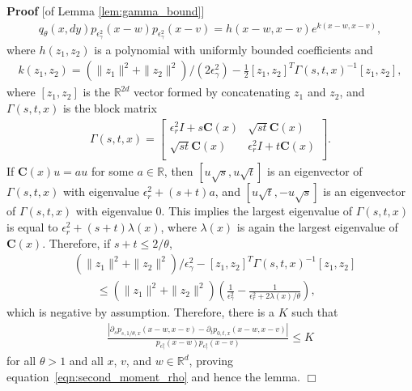 \documentclass[12pt]{article}
\newenvironment {proof}{{\noindent\bf Proof }}{\hfill $\Box$ \medskip}
\newcommand{\IR}{\mathbb R}
\newcommand{\covq}{\mathbf{C}}     %
\numberwithin{equation}{section}
\begin{document}
\begin{proof}[of Lemma \ref{lem:gamma_bound}]
\begin{align*}
{            q_\theta(x, dy)
        }{
            p_{\epsilon_\gamma^2}(x - w)
            p_{\epsilon_\gamma^2}(x - v)
        }
        =
        h(x-w, x-v) e^{ k(x-w, x-v) },
    \end{align*}
    where $h(z_1, z_2)$ is a polynomial with uniformly bounded coefficients and
    \begin{align*}
        k(z_1, z_2)
        =
        (\|z_1\|^2 + \|z_2\|^2)/(2 \epsilon_\gamma^2)
            - \frac{1}{2} [z_1, z_2]^T \Gamma(s, t, x)^{-1} [z_1, z_2] ,
    \end{align*}
    where $[z_1, z_2]$ is the $\IR^{2d}$ vector formed by concatenating $z_1$ and $z_2$,
    and $\Gamma(s, t, x)$ is the block matrix
    \begin{align*}
        \Gamma(s, t, x)
        =
        \left[
        \begin{array}{cc}
            \epsilon_r^2 I + s \covq(x) & \sqrt{st} \covq(x) \\
            \sqrt{st} \covq(x) & \epsilon_r^2 I + t \covq(x) \\
        \end{array}
        \right] .
    \end{align*}
    If $\covq(x) u = a u$ for some $a \in \IR$,
    then $[u \sqrt{s}, u \sqrt{t}]$ is an eigenvector of $\Gamma(s, t, x)$
    with eigenvalue $\epsilon^2_r + (s+t) a$,
    and $[u \sqrt{t}, - u \sqrt{s}]$ is an eigenvector of $\Gamma(s, t, x)$
    with eigenvalue 0.
    This implies the largest eigenvalue of $\Gamma(s, t, x)$
    is equal to $\epsilon^2_r + (s+t) \lambda(x)$,
    where $\lambda(x)$ is again the largest eigenvalue of $\covq(x)$.
    Therefore, if $s + t \le 2 / \theta$,
    \begin{align*}
        &
        (\|z_1\|^2 + \|z_2\|^2) / \epsilon^2_\gamma
            - [z_1, z_2]^T \Gamma(s, t, x)^{-1} [z_1, z_2]
        \\ &\qquad \le
        (\|z_1\|^2 + \|z_2\|^2) \left(
            \frac{1}{\epsilon^2_\gamma}
            - \frac{1}{\epsilon^2_r +  2\lambda(x)/\theta}
        \right) ,
    \end{align*}
    which is negative by assumption.
    Therefore, there is a $K$ such that
    \begin{align*}
        \frac{ \left|
            \partial_s p_{s, 1/\theta, x}(x-w, x-v)
            - \partial_t p_{0, t, x}(x-w, x-v)
        \right| }{
            p_{\epsilon^2_\gamma}(x - w)
            p_{\epsilon^2_\gamma}(x - v)
        }
        \le K
    \end{align*}
    for all $\theta > 1$ and all $x$, $v$, and $w \in \IR^d$,
    proving equation~\eqref{eqn:second_moment_rho} and hence the lemma.
\end{proof}
\end{document}
